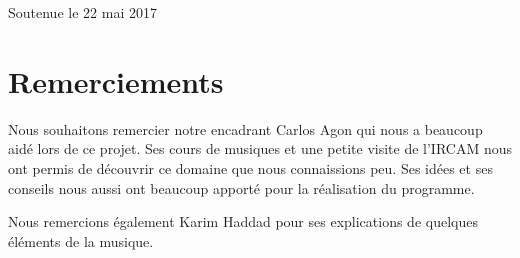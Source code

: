 \documentclass[a4paper,12pt]{article}
\begin{document}
\begin{titlepage}
\begin{center}
\vspace*{2cm}

{\large Soutenue le 22 mai 2017}\\[1cm]

\vfill

\end{center}
\end{titlepage}


\newpage\null\thispagestyle{empty}\newpage


\tableofcontents

\newpage\null\thispagestyle{empty}\newpage



\section{Remerciements}

Nous souhaitons remercier notre encadrant Carlos Agon qui nous a beaucoup aidé lors de ce projet. Ses cours de musiques et une petite visite de l'IRCAM nous ont permis de découvrir ce domaine que nous connaissions peu. Ses idées et ses conseils nous aussi ont beaucoup apporté pour la réalisation du programme.

\par
Nous remercions également Karim Haddad pour ses explications de quelques éléments de la musique.


\newpage\null\thispagestyle{empty}\newpage



\listoffigures %

\newpage\null\thispagestyle{empty}\newpage









\pagestyle{fancy}










%





\nocite{*}
\end{document}
